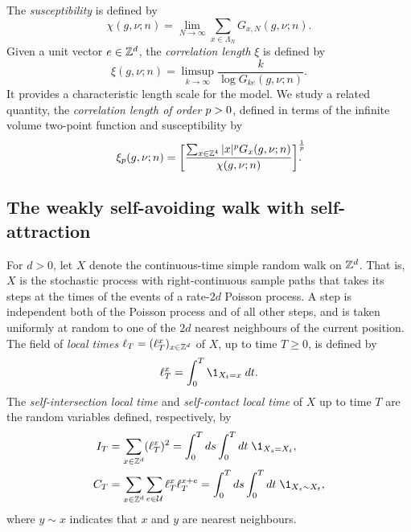 The \emph{susceptibility} is defined by
\begin{equation}
\label{e:susceptibility-def}
\chi(g, \nu; n)
= \lim_{N\to\infty} \sum_{x\in\Lambda_N} G_{x,N} (g,\nu; n).
\end{equation}
Given a unit vector $e\in { {{\mathbb Z}}^d }$,
the \emph{correlation length} $\xi$ is defined by
\begin{equation}\label{e:xidef}
\xi (g,\nu; n) = \limsup_{k \to \infty} \frac{k}{\log G_{ke}(g, \nu; n)}.
\end{equation}
It provides a characteristic length scale for the model.
We study a related quantity,
the \emph{correlation length of order} $p >0$,
defined in terms of the infinite volume two-point function and susceptibility by
\begin{equation}
\label{e:clp}
\xi_{p} (g, \nu; n)
=
    \left[\frac{\sum_{x \in {\mathbb Z}^4} |x|^p G_{x}(g, \nu; n)}
    {\chi(g, \nu; n)}\right]^\frac{1}{p}
\hspace{-8pt}.
\end{equation}


\subsection{The weakly self-avoiding walk with self-attraction}

For $d>0$, let $X$ denote the continuous-time simple random walk on ${ {{\mathbb Z}}^d }$.
That is, $X$ is the stochastic process
with right-continuous sample paths that takes its steps at the times
of the events of a rate-$2d$ Poisson process.  A step is independent both
of the Poisson process and of all other steps, and is taken uniformly
at random to one of the $2d$ nearest neighbours of the current
position.
The field of \emph{local times} $\ell_T = (\ell_T^x)_{x\in {\mathbb Z}^d}$
of  $X$, up to time $T \ge 0$,
is defined by
\begin{equation}
\label{e:LTx-def}
  \lt_T^x = \int_0^T \1_{X_t = x} \; dt
  .
\end{equation}
The \emph{self-intersection local time} and \emph{self-contact local time}
of $X$ up to time $T$ are the random variables defined, respectively, by
\begin{align}
\label{e:ITdef}
  I_T &=
  \sum_{x \in \Z^d} (\lt_T^x)^2
  = \int_0^T ds \int_0^T dt \; \1_{X_{s}=X_{t}}
  ,\\
\lbeq{CTdef}
  C_T
  &=
  \sum_{x \in \Z^d}\sum_{e\in\Ucal} \lt_T^x\lt_T^{x+e}
  = \int_0^T ds \int_0^T dt \; \1_{X_{s} \sim X_{t}}
  ,
\end{align}
where
$y\sim x$ indicates that $x$ and $y$ are nearest neighbours.

